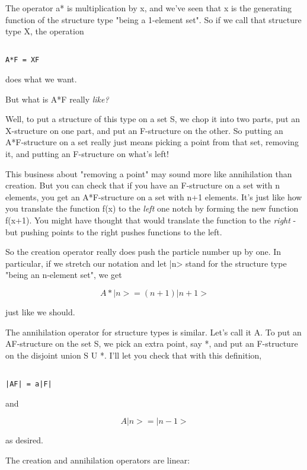 The operator a* is multiplication by x, and we've seen that x is the
generating function of the structure type "being a 1-element set".   
So if we call that structure type X, the operation


\begin{verbatim}

A*F = XF
\end{verbatim}
    
does what we want.

But what is A*F really \emph{like?}

Well, to put a structure of this type on a set S, we chop it into two
parts, put an X-structure on one part, and put an F-structure on the
other.  So putting an A*F-structure on a set really just means picking 
a point from that set, removing it, and putting an F-structure on what's
left!

This business about "removing a point" may sound more like
annihilation than creation.  But you can check that if you have an
F-structure on a set with n elements, you get an A*F-structure on a set
with n+1 elements. It's just like how you translate the function f(x) to
the \emph{left} one notch by forming the new function f(x+1).  You might have
thought that would translate the function to the \emph{right} - but pushing
points to the right pushes functions to the left.

So the creation operator really does push the particle number up by one.
In  particular, if we stretch our notation and let |n> stand for the
structure type "being an n-element set", we get


$$

A*|n> = (n+1) |n+1>
$$
    
just like we should. 

The annihilation operator for structure types is similar.  Let's call it
A.  To put an AF-structure on the set S, we pick an extra point, say *,
and put an F-structure on the disjoint union S U {*}.  I'll let you
check that with this definition,


\begin{verbatim}

|AF| = a|F|
\end{verbatim}
    
and


$$

A|n> = |n-1>
$$
    
as desired.

The creation and annihilation operators are linear:


